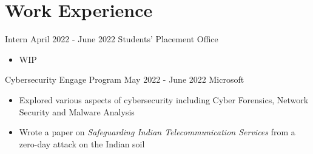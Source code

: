 \section*{\sc Work Experience}
\vspace{-2mm}
\hrulefill
\vspace{1mm}

\excventry
{Intern}
{April 2022 - June 2022}
{Students' Placement Office}
{
  \begin{itemize}
    \item WIP
  \end{itemize}
}


\excventry
{Cybersecurity Engage Program}
{May 2022 - June 2022}
{Microsoft}
{
  \begin{itemize}
    \item Explored various aspects of cybersecurity including Cyber Forensics, Network Security and Malware Analysis
    \item Wrote a paper on \textit{Safeguarding Indian Telecommunication Services} from a zero-day attack on the Indian soil
  \end{itemize}
}

\vspace{-2mm}
